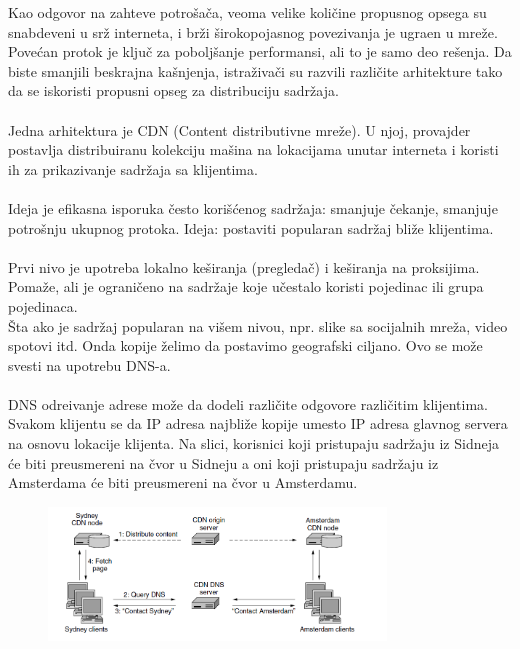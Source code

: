 \documentclass{article} %
\begin{document}
Kao odgovor na zahteve potro\v sa\v ca, veoma velike koli\v cine propusnog opsega su snabdeveni u sr\v z interneta, i br\v zi \v sirokopojasnog povezivanja je ugra\dj en u mre\v ze. Pove\' can protok je klju\v c za pobolj\v sanje performansi,
ali to je samo deo re\v senja. Da biste smanjili beskrajna ka\v snjenja, istra\v ziva\v ci su razvili razli\v cite arhitekture tako da se iskoristi propusni opseg za distribuciju sadr\v zaja.
\\
\\
Jedna arhitektura je CDN (Content distributivne mre\v ze). U njoj, provajder postavlja distribuiranu kolekciju ma\v sina na lokacijama unutar interneta i koristi ih za prikazivanje sadr\v zaja sa klijentima.
\\
\\ Ideja je efikasna isporuka \v cesto kori\v s\' cenog sadr\v zaja: smanjuje \v cekanje, smanjuje potro\v snju ukupnog protoka. Ideja: postaviti popularan sadr\v zaj bli\v ze klijentima.
\\
\\ Prvi nivo je upotreba lokalno ke\v siranja (pregleda\v c) i ke\v siranja na proksijima. Poma\v ze, ali je ograni\v ceno na sadr\v zaje koje u\v cestalo koristi pojedinac ili grupa pojedinaca.
\\\v Sta ako je sadr\v zaj popularan na vi\v sem nivou, npr. slike sa socijalnih mre\v za, video spotovi itd. Onda kopije \v zelimo da postavimo geografski ciljano. Ovo se mo\v ze svesti na upotrebu DNS-a.
\\ 
\\ DNS odre\dj ivanje adrese mo\v ze da dodeli razli\v cite odgovore razli\v citim klijentima. Svakom klijentu se da IP adresa najbli\v ze kopije umesto IP adresa glavnog servera na osnovu lokacije klijenta. Na slici, korisnici koji pristupaju sadr\v zaju iz Sidneja \' ce biti preusmereni na \v cvor u Sidneju a oni koji pristupaju sadr\v zaju iz Amsterdama \' ce biti preusmereni na \v cvor u Amsterdamu.

\begin{figure}[H]
	\centering
	\includegraphics[width=0.8\textwidth]{slike-aplikativniSloj/cdn.png}
\end{figure}
\end{document}
